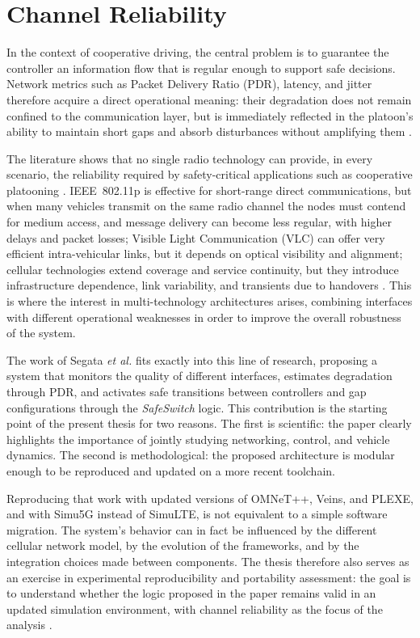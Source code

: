 \section{Channel Reliability}

In the context of cooperative driving, the central problem is to guarantee the controller an information flow that is regular enough to support safe decisions. Network metrics such as Packet Delivery Ratio (PDR), latency, and jitter therefore acquire a direct operational meaning: their degradation does not remain confined to the communication layer, but is immediately reflected in the platoon's ability to maintain short gaps and absorb disturbances without amplifying them \cite{segata2015communication,giordano2019joint}.

The literature shows that no single radio technology can provide, in every scenario, the reliability required by safety-critical applications such as cooperative platooning \cite{segata2023multi-technology}. IEEE~802.11p is effective for short-range direct communications, but when many vehicles transmit on the same radio channel the nodes must contend for medium access, and message delivery can become less regular, with higher delays and packet losses; Visible Light Communication (VLC) can offer very efficient intra-vehicular links, but it depends on optical visibility and alignment; cellular technologies extend coverage and service continuity, but they introduce infrastructure dependence, link variability, and transients due to handovers \cite{ishihara2015improving,hardes2019communication,bazzi2020wireless}. This is where the interest in multi-technology architectures arises, combining interfaces with different operational weaknesses in order to improve the overall robustness of the system.

The work of Segata \emph{et al.} \cite{segata2023multi-technology} fits exactly into this line of research, proposing a system that monitors the quality of different interfaces, estimates degradation through PDR, and activates safe transitions between controllers and gap configurations through the \emph{SafeSwitch} logic. This contribution is the starting point of the present thesis for two reasons. The first is scientific: the paper clearly highlights the importance of jointly studying networking, control, and vehicle dynamics. The second is methodological: the proposed architecture is modular enough to be reproduced and updated on a more recent toolchain.

Reproducing that work with updated versions of OMNeT++, Veins, and PLEXE, and with Simu5G instead of SimuLTE, is not equivalent to a simple software migration. The system's behavior can in fact be influenced by the different cellular network model, by the evolution of the frameworks, and by the integration choices made between components. The thesis therefore also serves as an exercise in experimental reproducibility and portability assessment: the goal is to understand whether the logic proposed in the paper remains valid in an updated simulation environment, with channel reliability as the focus of the analysis \cite{nardini2020simu5g,segata2023multi-technology}.
